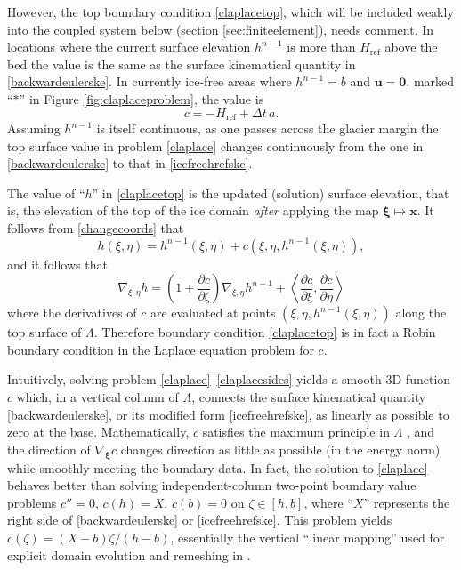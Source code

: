\documentclass[letterpaper,final,12pt,reqno]{amsart}
\newcommand{\grad}{\nabla}
\newcommand{\bu}{\mathbf{u}}
\newcommand{\bx}{\mathbf{x}}
\newcommand{\bxi}{\bm{\xi}}
\newcommand{\bzero}{\bm{0}}
\newcommand{\Href}{H_{\text{ref}}}
\begin{document}
However, the top boundary condition \eqref{claplacetop}, which will be included weakly into the coupled system below (section \ref{sec:finiteelement}), needs comment.  In locations where the current surface elevation $h^{n-1}$ is more than $\Href$ above the bed the value is the same as the surface kinematical quantity in \eqref{backwardeulerske}.  In currently ice-free areas where $h^{n-1}=b$ and $\bu=\bzero$, marked ``$\ast$'' in Figure \ref{fig:claplaceproblem}, the value is
\begin{equation}
    c = - \Href + \Delta t\,a. \label{icefreehrefske}
\end{equation}
Assuming $h^{n-1}$ is itself continuous, as one passes across the glacier margin the top surface value in problem \eqref{claplace} changes continuously from the one in \eqref{backwardeulerske} to that in \eqref{icefreehrefske}.

The value of ``$h$'' in \eqref{claplacetop} is the updated (solution) surface elevation, that is, the elevation of the top of the ice domain \emph{after} applying the map $\bxi\mapsto \bx$.  It follows from \eqref{changecoords} that
\begin{equation}
h(\xi,\eta) = h^{n-1}(\xi,\eta) + c(\xi,\eta,h^{n-1}(\xi,\eta)), \label{hmeaning}
\end{equation}
and it follows that
\begin{equation}
\grad_{\xi,\eta} h = \left(1+\frac{\partial c}{\partial\zeta}\right) \grad_{\xi,\eta} h^{n-1} + \left<\frac{\partial c}{\partial\xi},\frac{\partial c}{\partial\eta}\right> \label{hgradient}
\end{equation}
where the derivatives of $c$ are evaluated at points $(\xi,\eta,h^{n-1}(\xi,\eta))$ along the top surface of $\Lambda$.  Therefore boundary condition \eqref{claplacetop} is in fact a Robin boundary condition in the Laplace equation problem for $c$.

Intuitively, solving problem \eqref{claplace}--\eqref{claplacesides} yields a smooth 3D function $c$ which, in a vertical column of $\Lambda$, connects the surface kinematical quantity \eqref{backwardeulerske}, or its modified form \eqref{icefreehrefske}, as linearly as possible to zero at the base.  Mathematically, $c$ satisfies the maximum principle in $\Lambda$ \cite{Evans2010}, and the direction of $\grad_{\bxi} c$ changes direction as little as possible (in the energy norm) while smoothly meeting the boundary data.  In fact, the solution to \eqref{claplace} behaves better than solving independent-column two-point boundary value problems $c''=0$, $c(h)=X$, $c(b)=0$ on $\zeta\in[h,b]$, where ``$X$'' represents the right side of \eqref{backwardeulerske} or \eqref{icefreehrefske}.  This problem yields $c(\zeta)=(X-b)\zeta/(h-b)$, essentially the vertical ``linear mapping'' used for explicit domain evolution and remeshing in \cite[equation (22)]{Lengetal2012}.
\end{document}
